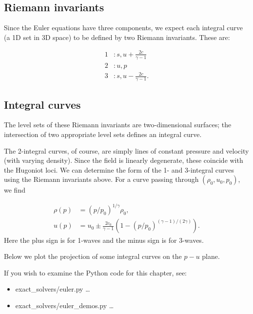 \documentclass{SIAMbook2016}
\providecommand{\tightlist}{%
      \setlength{\itemsep}{0pt}\setlength{\parskip}{0pt}}
\begin{document}
\hypertarget{riemann-invariants}{%
\subsection{Riemann invariants}\label{riemann-invariants}}

Since the Euler equations have three components, we expect each integral
curve (a 1D set in 3D space) to be defined by two Riemann invariants.
These are:

\begin{align}
1 & : s, u+\frac{2c}{\gamma-1} \\
2 & : u, p \\
3 & : s, u-\frac{2c}{\gamma-1}.
\end{align}

\hypertarget{integral-curves}{%
\subsection{Integral curves}\label{integral-curves}}

The level sets of these Riemann invariants are two-dimensional surfaces;
the intersection of two appropriate level sets defines an integral
curve.

The 2-integral curves, of course, are simply lines of constant pressure
and velocity (with varying density). Since the field is linearly
degenerate, these coincide with the Hugoniot loci. We can determine the
form of the 1- and 3-integral curves using the Riemann invariants above.
For a curve passing through \((\rho_0,u_0,p_0)\), we find

\begin{align}
    \rho(p) &= (p/p_0)^{1/\gamma} \rho_0,\\
    u(p) & = u_0 \pm \frac{2c_0}{\gamma-1}\left(1-(p/p_0)^{(\gamma-1)/(2\gamma)}\right).
\end{align} Here the plus sign is for 1-waves and the minus sign is for
3-waves.

Below we plot the projection of some integral curves on the \(p-u\)
plane.

If you wish to examine the Python code for this chapter, see:

\begin{itemize}
\tightlist
\item
  {exact\_solvers/euler.py} \ldots{}
\item
  {exact\_solvers/euler\_demos.py} \ldots{}
\end{itemize}
\end{document}
